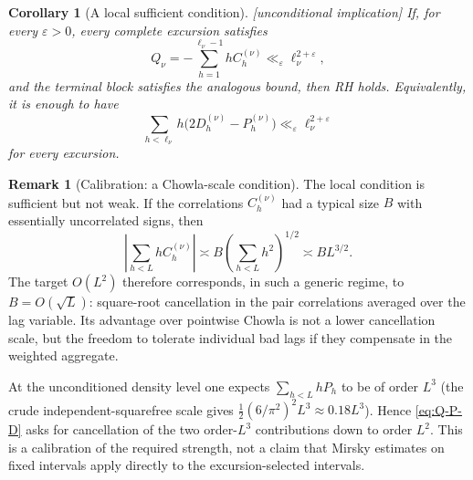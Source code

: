 \documentclass[11pt,reqno]{amsart}
\theoremstyle{plain}
\newtheorem{corollary}[theorem]{Corollary}
\theoremstyle{definition}
\newtheorem{remark}[theorem]{Remark}
\newcommand{\eps}{\varepsilon}
\begin{document}
\begin{corollary}[A local sufficient condition]
\label{cor:local-corr-sufficient}
\emph{[unconditional implication]} If, for every $\eps>0$, every complete
excursion satisfies
\[
  Q_\nu=-\sum_{h=1}^{\ell_\nu-1}hC_h^{(\nu)}
  \ll_\eps \ell_\nu^{2+\eps},
\]
and the terminal block satisfies the analogous bound, then RH holds.
Equivalently, it is enough to have
\[
  \sum_{h<\ell_\nu}h\bigl(2D_h^{(\nu)}-P_h^{(\nu)}\bigr)
  \ll_\eps \ell_\nu^{2+\eps}
\]
for every excursion.
\end{corollary}

\begin{remark}[Calibration: a Chowla-scale condition]
\label{rem:chowla-scale}
The local condition is sufficient but not weak.  If the correlations
$C_h^{(\nu)}$ had a typical size $B$ with essentially uncorrelated signs,
then
\[
  \left|\sum_{h<L}hC_h^{(\nu)}\right|
  \asymp B\left(\sum_{h<L}h^2\right)^{1/2}
  \asymp B L^{3/2}.
\]
The target $O(L^2)$ therefore corresponds, in such a generic regime, to
$B=O(\sqrt L)$: square-root cancellation in the pair correlations averaged
over the lag variable.  Its advantage over pointwise Chowla is not a lower
cancellation scale, but the freedom to tolerate individual bad lags if they
compensate in the weighted aggregate.

At the unconditioned density level one expects
$\sum_{h<L}hP_h$ to be of order $L^3$ (the crude independent-squarefree
scale gives $\tfrac12(6/\pi^2)^2L^3\approx0.18L^3$).  Hence
\eqref{eq:Q-P-D} asks for cancellation of the two order-$L^3$ contributions
down to order $L^2$.  This is a calibration of the required strength, not a
claim that Mirsky estimates on fixed intervals apply directly to the
excursion-selected intervals.
\end{remark}
\end{document}
